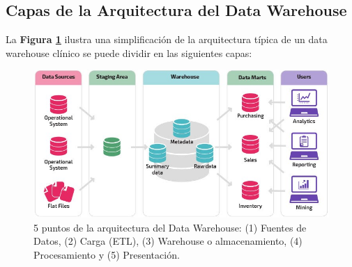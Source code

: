 \documentclass[12pt, a4paper, twoside]{article}
\begin{document}
	\subsection{Capas de la Arquitectura del Data Warehouse}
	
	La \textbf{Figura \ref{fig:Arqui}} ilustra una simplificación de la arquitectura típica de un data warehouse clínico se puede dividir en las siguientes capas:
	
	
	\begin{figure}[h!]
		\centering %
		\includegraphics[width=1\textwidth]{image/Arquitectura.jpg}
		\caption{5 puntos de la arquitectura del Data Warehouse: (1) Fuentes de Datos, (2) Carga (ETL), (3) Warehouse o almacenamiento, (4) Procesamiento y (5) Presentación.} %
		\label{fig:Arqui}
	\end{figure}
	\vspace{9cm}
	
\end{document}
